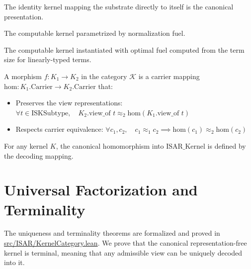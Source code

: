 \begin{definition}
The identity kernel mapping the substrate directly to itself is the canonical presentation.
\end{definition}

\begin{definition}
The computable kernel parametrized by normalization fuel.
\end{definition}

\begin{definition}
The computable kernel instantiated with optimal fuel computed from the term size for linearly-typed terms.
\end{definition}

\begin{definition}
A morphism $f : K_1 \to K_2$ in the category $\mathcal{K}$ is a carrier mapping $\text{hom} : K_1.\text{Carrier} \to K_2.\text{Carrier}$ that:
\begin{itemize}
    \item Preserves the view representations: $\forall t \in \text{ISKSubtype}, \quad K_2.\text{view\_of } t \approx_2 \text{hom}(K_1.\text{view\_of } t)$
    \item Respects carrier equivalence: $\forall c_1, c_2, \quad c_1 \approx_1 c_2 \implies \text{hom}(c_1) \approx_2 \text{hom}(c_2)$
\end{itemize}
\end{definition}

\begin{definition}
For any kernel $K$, the canonical homomorphism into $\text{ISAR\_Kernel}$ is defined by the decoding mapping.
\end{definition}

\section{Universal Factorization and Terminality}

The uniqueness and terminality theorems are formalized and proved in \url{src/ISAR/KernelCategory.lean}. We prove that the canonical representation-free kernel is terminal, meaning that any admissible view can be uniquely decoded into it.

